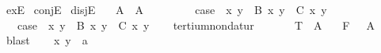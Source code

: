 \begin{isabellebody}
\begin{isamarkuptext}
\begin{itemize}
  \end{itemize}%
\end{isamarkuptext}%
\isamarkuptrue%
\isamarkupfalse%
\ exE\isanewline
{}\isamarkupfalse%
\ conjE\isanewline
{}\isamarkupfalse%
\ disjE\isanewline
\isanewline
{}\isamarkupfalse%
\isanewline
\ \ \ A{}\ \ A{}\ \ %
\isanewline
\ \ \isanewline
\ \ \ \ {}case{}{}\ \ x\ y\ \ {}B{}\ x\ y{}\ \ {}C{}\ x\ y{}\isanewline
\ \ {}\ {}case{}{}\ \ x\ y\ \ {}B{}\ x\ y{}\ \ {}C{}\ x\ y{}\isanewline
%
\isadelimproof
\ \ %
\endisadelimproof
%
\isatagproof
{}\isamarkupfalse%
%
\endisatagproof
{\isafoldproof}%
%
\isadelimproof
%
\endisadelimproof
%
\isamarkuptrue%
\isamarkupfalse%
\ tertium{}non{}datur{}\isanewline
\ \ \isanewline
\ \ \ \ {}T{}\ \ A\isanewline
\ \ {}\ {}F{}\ \ {}{}\ A{}\isanewline
%
\isadelimproof
\ \ %
\endisadelimproof
%
\isatagproof
{}\isamarkupfalse%
\ blast%
\endisatagproof
{\isafoldproof}%
%
\isadelimproof
\isanewline
%
\endisadelimproof
\isanewline
{}\isamarkupfalse%
\isanewline
{}\isanewline
%
\isadelimproof
\ \ %
\endisadelimproof
%
\isatagproof
{}\isamarkupfalse%
\ x\ y\ {}{}\ {}a\isanewline

\end{isabellebody}
